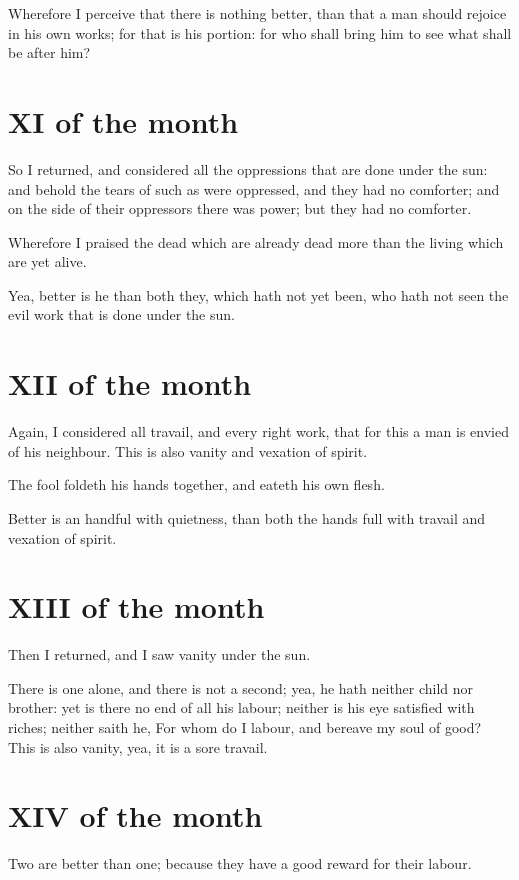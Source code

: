 Wherefore I perceive that there is nothing better, than that a man should rejoice in his own works; for that is his portion: for who shall bring him to see what shall be after him?

\section*{XI of the month}

So I returned, and considered all the oppressions that are done under the sun: and behold the tears of such as were oppressed, and they had no comforter; and on the side of their oppressors there was power; but they had no comforter.

Wherefore I praised the dead which are already dead more than the living which are yet alive.

Yea, better is he than both they, which hath not yet been, who hath not seen the evil work that is done under the sun.

\section*{XII of the month}

Again, I considered all travail, and every right work, that for this a man is envied of his neighbour. This is also vanity and vexation of spirit.

The fool foldeth his hands together, and eateth his own flesh.

Better is an handful with quietness, than both the hands full with travail and vexation of spirit.

\section*{XIII of the month}

Then I returned, and I saw vanity under the sun.

There is one alone, and there is not a second; yea, he hath neither child nor brother: yet is there no end of all his labour; neither is his eye satisfied with riches; neither saith he, For whom do I labour, and bereave my soul of good? This is also vanity, yea, it is a sore travail.

\section*{XIV of the month}

Two are better than one; because they have a good reward for their labour.

